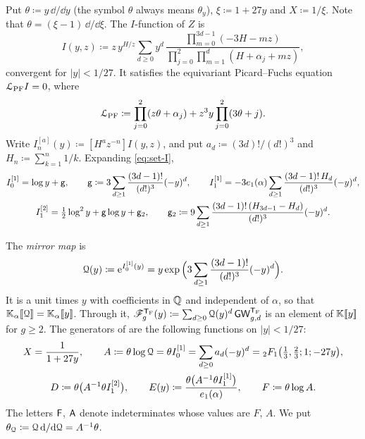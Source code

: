 Put $\theta\coloneqq y\,\dd/\dd y$ (the symbol $\theta$ always means $\theta_y$), $\xi\coloneqq1+27y$ and $X\coloneqq1/\xi$. Note that $\theta=(\xi-1)\,\dd/\dd\xi$. The $I$-function of $Z$ is
\begin{equation}
\label{eq:set-I}
I(y,z)\coloneqq z\,y^{H/z}\sum_{d\geq0}y^d\,\frac{\prod_{m=0}^{3d-1}(-3H-mz)}{\prod_{j=0}^{2}\prod_{m=1}^{d}(H+\alpha_j+mz)},
\end{equation}
convergent for $|y|<1/27$. It satisfies the equivariant Picard--Fuchs equation $\mathcal{L}_{\mathrm{PF}} I=0$, where
\begin{equation}
\label{eq:set-pf}
\mathcal{L}_{\mathrm{PF}}\coloneqq\prod_{j=0}^{2}(z\theta+\alpha_j)+z^3y\prod_{j=0}^{2}(3\theta+j).
\end{equation}
Write $I^{[a]}_n(y)\coloneqq[H^az^{-n}]I(y,z)$, and put $a_d\coloneqq(3d)!/(d!)^3$ and $H_n\coloneqq\sum_{k=1}^n1/k$. Expanding \eqref{eq:set-I},
\begin{equation}
\label{eq:set-Ian}
\begin{gathered}
I_0^{[1]}=\log y+\mathsf{g},\qquad \mathsf{g}\coloneqq3\sum_{d\geq1}\frac{(3d-1)!}{(d!)^3}(-y)^d,\qquad
I_1^{[1]}=-3e_1(\alpha)\sum_{d\geq1}\frac{(3d-1)!\,H_d}{(d!)^3}(-y)^d,\\
I_1^{[2]}=\tfrac12\log^2y+\mathsf{g}\log y+\mathsf{g}_{2},\qquad \mathsf{g}_{2}\coloneqq9\sum_{d\geq1}\frac{(3d-1)!\,(H_{3d-1}-H_d)}{(d!)^3}(-y)^d.
\end{gathered}
\end{equation}

The \emph{mirror map} is
\[
\mathcal{Q}(y)\coloneqq\mathrm{e}^{I_0^{[1]}(y)}=y\exp\Big(3\sum_{d\geq1}\frac{(3d-1)!}{(d!)^3}(-y)^d\Big).
\]
It is a unit times $y$ with coefficients in $\mathbb{Q}$ and independent of $\alpha$, so that $\mathbb{K}_{\alpha}[\![ \mathcal{Q} ]\!]=\mathbb{K}_{\alpha}[\![ y ]\!]$. Through it, $\mathscr{F}_g^{\mathsf{T}_{\mathrm{F}}}(y)\coloneqq\sum_{d\geq0}\mathcal{Q}(y)^d\,\mathsf{GW}_{g,d}^{\mathsf{T}_{\mathrm{F}}}$ is an element of $\mathbb{K}[\![ y ]\!]$ for $g\geq2$. The generators of \cite{BS} are the following functions on $|y|<1/27$:
\begin{equation}
\label{eq:set-gens}
\begin{gathered}
X=\frac{1}{1+27y},\qquad
A\coloneqq\theta\log\mathcal{Q}=\theta I_0^{[1]}=\sum_{d\geq0}a_d(-y)^d={}_2F_1\big(\tfrac13,\tfrac23;1;-27y\big),\\
D\coloneqq\theta\big(A^{-1}\theta I_1^{[2]}\big),\qquad
E(y)\coloneqq\frac{\theta\big(A^{-1}\theta I_1^{[1]}\big)}{e_1(\alpha)},\qquad
F\coloneqq\theta\log A.
\end{gathered}
\end{equation}
 The letters $\mathsf{F}$, $\mathsf{A}$ denote indeterminates whose values are $F$, $A$. We put $\theta_{\mathcal{Q}}\coloneqq\mathcal{Q}\,\mathrm{d}/\mathrm{d}\mathcal{Q}=A^{-1}\theta$.

